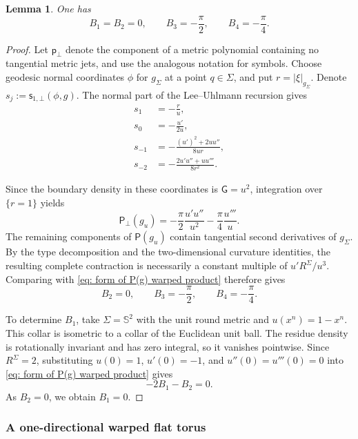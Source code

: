 \documentclass[11pt]{amsart}
\newtheorem{lemma}[theorem]{Lemma}
\theoremstyle{definition}
\numberwithin{equation}{section}
\begin{document}
\begin{lemma}\label{lem: B_1, B_2, B_3, B_4}
One has
\[
 B_1=B_2=0,\qquad B_3=-\frac\pi2,\qquad B_4=-\frac\pi4.
\]
\end{lemma}

\begin{proof}
Let $\mathsf p_\bot$ denote the component of a metric polynomial containing no tangential metric jets, and use the analogous notation for symbols.  Choose geodesic normal coordinates $\phi$ for $g_\Sigma$ at a point $q\in\Sigma$, and put $r=|\xi|_{g_\Sigma}$. Denote $s_j := \mathsf s_{1,\bot}(\phi,g)$. The normal part of the Lee--Uhlmann recursion gives
\begin{align*}
 s_1 &= -\frac r u,\\
 s_0 &= -\frac{u'}{2u},\\
 s_{-1} &= -\frac{(u')^2+2uu''}{8ur},\\
 s_{-2} &= -\frac{2u'u''+uu'''}{8r^2}.
\end{align*}

Since the boundary density in these coordinates is $\mathsf G=u^2$, integration over $\{r=1\}$ yields
\begin{equation}\label{eq: P_bot(g_u)}
 \mathsf P_\bot(g_u)
 =-\frac\pi2\frac{u'u''}{u^2}-\frac\pi4\frac{u'''}u.
\end{equation}
The remaining components of $\mathsf P(g_u)$ contain tangential second derivatives of $g_\Sigma$.  By the type decomposition and the two-dimensional curvature identities, the resulting complete contraction is necessarily a constant multiple of $u'R^\Sigma/u^3$.  Comparing with \eqref{eq: form of P(g) warped product} therefore gives
\[
 B_2=0,\qquad B_3=-\frac\pi2,\qquad B_4=-\frac\pi4.
\]

To determine $B_1$, take $\Sigma=\mathbb S^2$ with the unit round metric and $u(x^n)=1-x^n$.  This collar is isometric to a collar of the Euclidean unit ball.  The residue density is rotationally invariant and has zero integral, so it vanishes pointwise.  Since $R^\Sigma=2$, substituting $u(0)=1$, $u'(0)=-1$, and $u''(0)=u'''(0)=0$ into \eqref{eq: form of P(g) warped product} gives
\[
 -2B_1-B_2=0.
\]
As $B_2=0$, we obtain $B_1=0$.
\end{proof}


\subsubsection{A one-directional warped flat torus}
\end{document}
